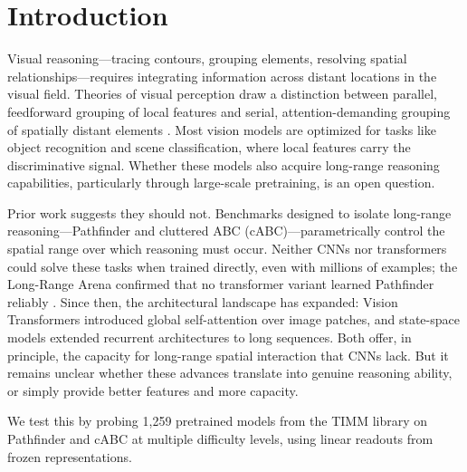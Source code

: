 \documentclass[10pt,letterpaper]{article}
\begin{document}
\section{Introduction}
Visual reasoning---tracing contours, grouping elements, resolving spatial relationships---requires integrating information across distant locations in the visual field. Theories of visual perception draw a distinction between parallel, feedforward grouping of local features and serial, attention-demanding grouping of spatially distant elements \citep{Houtkamp}. Most vision models are optimized for tasks like object recognition and scene classification, where local features carry the discriminative signal. Whether these models also acquire long-range reasoning capabilities, particularly through large-scale pretraining, is an open question.

Prior work suggests they should not. Benchmarks designed to isolate long-range reasoning---Pathfinder \citep{Serre2018a, Serre2018b} and cluttered ABC (cABC)---parametrically control the spatial range over which reasoning must occur. Neither CNNs nor transformers could solve these tasks when trained directly, even with millions of examples; the Long-Range Arena confirmed that no transformer variant learned Pathfinder reliably \citep{LRA}. Since then, the architectural landscape has expanded: Vision Transformers \citep{Dosovitskiy} introduced global self-attention over image patches, and state-space models \citep{Gu} extended recurrent architectures to long sequences. Both offer, in principle, the capacity for long-range spatial interaction that CNNs lack. But it remains unclear whether these advances translate into genuine reasoning ability, or simply provide better features and more capacity.

We test this by probing 1,259 pretrained models from the TIMM library \citep{Wightman} on Pathfinder and cABC at multiple difficulty levels, using linear readouts from frozen representations.

\end{document}
